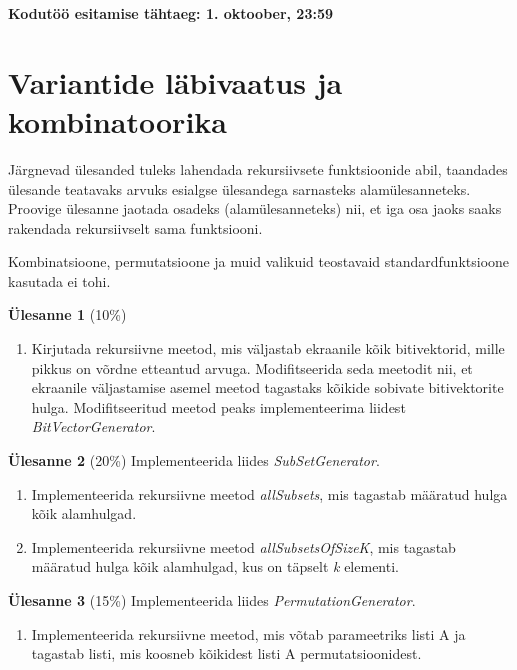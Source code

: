 \documentclass[a4paper]{article}
\begin{document}
\textbf{Kodutöö esitamise tähtaeg: 1. oktoober, 23:59}

\section*{Variantide läbivaatus ja kombinatoorika}

Järgnevad ülesanded tuleks lahendada rekursiivsete funktsioonide abil,
taandades ülesande teatavaks arvuks esialgse ülesandega sarnasteks
alamülesanneteks. Proovige ülesanne jaotada osadeks (alamülesanneteks)
nii, et iga osa jaoks saaks rakendada rekursiivselt sama funktsiooni.

Kombinatsioone, permutatsioone ja muid valikuid teostavaid standardfunktsioone kasutada ei tohi.

\begin{problem}
\textbf{Ülesanne 1} (10\%)
\begin{enumerate}
\item 
Kirjutada rekursiivne meetod, mis väljastab ekraanile kõik
bitivektorid, mille pikkus on võrdne etteantud arvuga. Modifitseerida seda meetodit nii, et ekraanile väljastamise asemel meetod tagastaks kõikide sobivate bitivektorite hulga. Modifitseeritud meetod peaks implementeerima liidest \textit{BitVectorGenerator}.
\end{enumerate}
\end{problem}

\begin{problem}
\textbf{Ülesanne 2} (20\%)
\newline
Implementeerida liides \textit{SubSetGenerator}.
\begin{enumerate}
\item
Implementeerida rekursiivne meetod \textit{allSubsets}, mis tagastab määratud hulga kõik alamhulgad.
\item
Implementeerida rekursiivne meetod \textit{allSubsetsOfSizeK}, mis tagastab määratud hulga kõik alamhulgad, kus on täpselt \textit{k} elementi.
\end{enumerate}
\end{problem}

\begin{problem}
\textbf{Ülesanne 3} (15\%)
\newline
Implementeerida liides \textit{PermutationGenerator}.
\begin{enumerate}
\item
Implementeerida rekursiivne meetod, mis võtab parameetriks listi A ja tagastab listi, mis koosneb kõikidest listi A permutatsioonidest.
\end{enumerate}
\end{problem}
\end{document}
